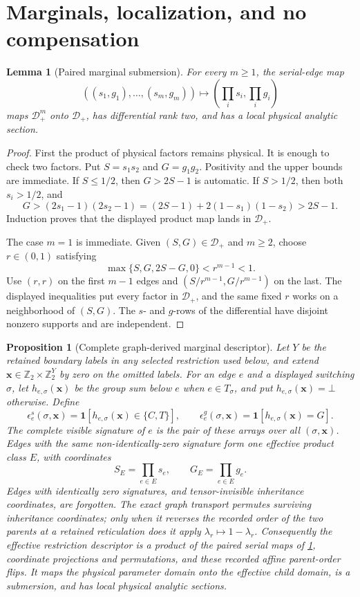 \documentclass[11pt]{article}
\newtheorem{proposition}[theorem]{Proposition}
\newtheorem{lemma}[theorem]{Lemma}
\theoremstyle{remark}
\newcommand{\G}{\mathbb Z_2\times\mathbb Z_2}
\newcommand{\Dplus}{\mathcal D_+}
\newcommand{\1}{\mathbf 1}
\begin{document}
\section{Marginals, localization, and no compensation}\label{sec:localization}

\begin{lemma}[Paired marginal submersion]\label{lem:marginal}
For every \(m\ge1\), the serial-edge map
\[
 ((s_1,g_1),\ldots,(s_m,g_m))
 \longmapsto\left(\prod_i s_i,\prod_i g_i\right)
\]
maps \(\Dplus^m\) onto \(\Dplus\), has differential rank two, and has a
local physical analytic section.
\end{lemma}

\begin{proof}
First the product of physical factors remains physical.  It is enough to
check two factors.  Put \(S=s_1s_2\) and \(G=g_1g_2\).  Positivity and the
upper bounds are immediate.  If \(S\leq1/2\), then \(G>2S-1\) is automatic.
If \(S>1/2\), then both \(s_i>1/2\), and
\[
 G>(2s_1-1)(2s_2-1)
  =(2S-1)+2(1-s_1)(1-s_2)>2S-1.
\]
Induction proves that the displayed product map lands in \(\Dplus\).

The case \(m=1\) is immediate.  Given \((S,G)\in\Dplus\) and \(m\ge2\),
choose \(r\in(0,1)\) satisfying
\[
 \max\{S,G,2S-G,0\}<r^{m-1}<1.
\]
Use \((r,r)\) on the first \(m-1\) edges and
\((S/r^{m-1},G/r^{m-1})\) on the last.  The displayed inequalities put every
factor in \(\Dplus\), and the same fixed \(r\) works on a neighborhood of
\((S,G)\).  The \(s\)- and \(g\)-rows of the differential have disjoint
nonzero supports and are independent.
\end{proof}

\begin{proposition}[Complete graph-derived marginal descriptor]
\label{prop:marginal-descriptor}
Let \(Y\) be the retained boundary labels in any selected restriction used
below, and extend \(\mathbf x\in\G^Y\) by zero on the omitted labels.  For an
edge \(e\) and a displayed switching \(\sigma\), let
\(h_{e,\sigma}(\mathbf x)\) be the group sum below \(e\) when
\(e\in T_\sigma\), and put \(h_{e,\sigma}(\mathbf x)=\bot\) otherwise.  Define
\[
 \epsilon_e^s(\sigma,\mathbf x)
   =\1[h_{e,\sigma}(\mathbf x)\in\{C,T\}],\qquad
 \epsilon_e^g(\sigma,\mathbf x)
   =\1[h_{e,\sigma}(\mathbf x)=G].
\]
The \emph{complete visible signature} of \(e\) is the pair of these arrays
over all \((\sigma,\mathbf x)\).  Edges with the same
non-identically-zero signature form one effective product class \(E\), with
coordinates
\[
 S_E=\prod_{e\in E}s_e,\qquad G_E=\prod_{e\in E}g_e.
\]
Edges with identically zero signatures, and tensor-invisible inheritance
coordinates, are forgotten.  The exact graph transport permutes surviving
inheritance coordinates; only
when it reverses the recorded order of the two parents at a retained
reticulation does it apply \(\lambda_r\mapsto1-\lambda_r\).  Consequently the
effective restriction descriptor is a product of the paired serial maps of
\cref{lem:marginal}, coordinate projections and permutations, and these
recorded affine parent-order flips.  It maps the physical parameter domain
onto the effective child domain, is a submersion, and has local physical
analytic sections.
\end{proposition}
\end{document}
